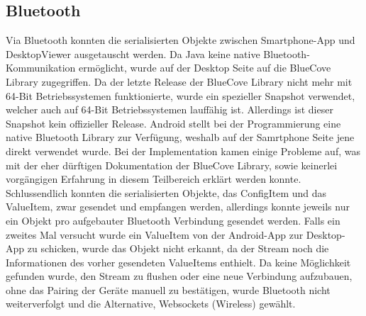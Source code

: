 \subsection{Bluetooth}
Via Bluetooth konnten die serialisierten Objekte zwischen Smartphone-App 
und DesktopViewer ausgetauscht werden. 
Da Java keine native Bluetooth-Kommunikation ermöglicht, wurde auf der 
Desktop Seite auf die BlueCove Library zugegriffen. Da der letzte Release der 
BlueCove Library nicht mehr mit 64-Bit Betriebssystemen funktionierte, wurde ein spezieller Snapshot 
verwendet, welcher auch auf 64-Bit Betriebssystemen lauffähig ist. Allerdings ist dieser Snapshot 
kein offizieller Release. \newline
Android stellt bei der Programmierung eine native Bluetooth 
Library zur Verfügung, weshalb auf der Samrtphone Seite jene direkt verwendet wurde. 
Bei der Implementation kamen einige Probleme auf, was mit der eher dürftigen 
Dokumentation der BlueCove Library, sowie keinerlei vorgängigen Erfahrung in diesem Teilbereich 
erklärt werden konnte. Schlussendlich konnten die serialisierten Objekte, das ConfigItem 
und das ValueItem, zwar gesendet und empfangen werden, allerdings konnte jeweils nur ein Objekt pro aufgebauter 
Bluetooth Verbindung gesendet werden. Falls ein zweites Mal versucht wurde ein ValueItem von der 
Android-App zur Desktop-App zu schicken, wurde das Objekt nicht erkannt, da der 
Stream noch die Informationen des vorher gesendeten ValueItems enthielt. 
Da keine Möglichkeit gefunden wurde, den Stream zu flushen oder eine neue 
Verbindung aufzubauen, ohne das Pairing der Geräte manuell zu bestätigen, wurde Bluetooth 
nicht weiterverfolgt und die Alternative, Websockets (Wireless) gewählt. 

            
